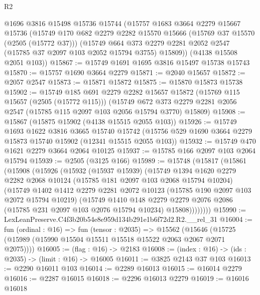 \begin{lexlean}{R2}
\begin{coremodule}
    @1696
    @3816
    @15498
    @15736
    @15744
    (@15757
      @1683
      @3664
      @2279
      @15667
      @15736
      (@15749
        @170
        @682
        @2279
        @2282
        @15570
        @15666
        (@15769 @37 @15570 (@2505 (@15772 @37)))
        (@15749
          @664
          @373
          @2279
          @2281
          @2052
          @2547
          (@15785 @37 @2097 @103 @2052 @15794 @3755)
          @15809))
      (@4138 @15508 @2051 @103))
@15867 := @15749 @1691 @1695 @3816 @15497 @15738 @15743
@15870 := @15757 @1690 @3664 @2279
@15871 := @2040 @15657
@15872 := @2057 @2547
@15873 := @15871 @15872
@15875 := @15870 @15873 @15738
@15902 := @15749
    @185
    @691
    @2279
    @2282
    @15657
    @15872
    (@15769 @115 @15657 (@2505 (@15772 @115)))
    (@15749 @672 @373 @2279 @2281 @2056 @2547 (@15785 @115 @2097 @103 @2056 @15794 @3770) @15809)
@15908 := @15867 (@15875 @15902 (@4138 @15515 @2055 @103))
@15926 := @15749
    @1693
    @1622
    @3816
    @3665
    @15740
    @15742
    (@15756 @529 @1690 @3664 @2279 @15873 @15740 @15902 (@12341 @15515 @2055 @103))
@15932 := @15749 @470 @1621 @2279 @3664 @2064 @10125
@15937 := @15785 @166 @2097 @103 @2064 @15794
@15939 := @2505 (@3125 @166)
@15989 := @15748
    (@15817
      (@15861
        (@15908
          (@15926
            (@15932
              (@15937 @15939)
              (@15749
                @1394
                @1620
                @2279
                @2282
                @2068
                @10124
                (@15785 @181 @2097 @103 @2068 @15794 @10204)
                (@15749
                  @1402
                  @1412
                  @2279
                  @2281
                  @2072
                  @10123
                  (@15785 @190 @2097 @103 @2072 @15794 @10219)
                  (@15749
                    @1410
                    @148
                    @2279
                    @2279
                    @2076
                    @2086
                    (@15785 @231 @2097 @103 @2076 @15794 @10234)
                    @15808))))))))
@15990 := LexLeanPreserve.C4f3b20b54e8e959d134b291e1b6f72d2.R2.__rel_31
@16004 := fun (ordinal : @16) =>
  fun (tensor : @2035) =>
  @15562 (@15646 (@15725 (@15989 (@15990 @15504 @15511 @15518 @15522 @2063 @2067 @2071 @2075))))
@16005 := (flag : @16) -> @2183
@16008 := (index : @16) -> (ids : @2035) -> (limit : @16) -> @16005
@16011 := @3825 @2143 @37 @103
@16013 := @2290 @16011 @103
@16014 := @2289 @16013
@16015 := @16014 @2279
@16016 := @2287 @16015
@16018 := @2296 @16013 @2279
@16019 := @16016 @16018

\end{coremodule}
\end{lexlean}
